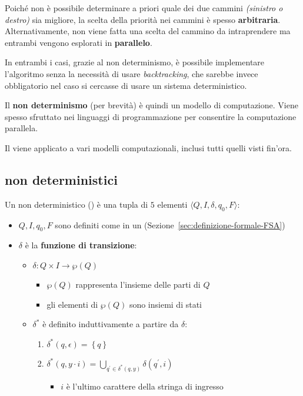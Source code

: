\documentclass[italian, 10pt]{article}
\begin{document}
Poiché non è possibile determinare a priori quale dei due cammini \textit{(sinistro o destro)} sia migliore, la scelta della priorità nei cammini è spesso \textbf{arbitraria}.
Alternativamente, non viene fatta una scelta del cammino da intraprendere ma entrambi vengono esplorati in \textbf{parallelo}.

In entrambi i casi, grazie al non determinismo, è possibile implementare l'algoritmo senza la necessità di usare \textit{backtracking}, che sarebbe invece obbligatorio nel caso si cercasse di usare un sistema deterministico.

\bigskip
Il \textbf{non determinismo} (\ND per brevità) è quindi un modello di computazione.
Viene spesso sfruttato nei linguaggi di programmazione per consentire la computazione parallela.

Il \ND viene applicato a vari modelli computazionali, inclusi tutti quelli visti fin'ora.

\subsection{\FSA non deterministici}
\label{sec:FSA-non-deterministici}

Un \FSA non deterministico (\NFA) è una tupla di \(5\) elementi \(\langle Q, I, \delta, q_0, F \rangle\):

\begin{itemize}
  \item \(Q, I, q_0, F\) sono definiti come in un \FSA (Sezione~\ref{sec:definizione-formale-FSA})
  \item \(\delta\) è la \textbf{funzione di transizione}:
        \begin{itemize}
          \item \(\delta: Q \times I \rightarrow \wp(Q)\)
                \begin{itemize}[label=\(\rightarrow\)]
                  \item \(\wp(Q)\) rappresenta l'insieme delle parti di \(Q\)
                  \item gli elementi di \(\wp(Q)\) sono insiemi di stati
                \end{itemize}
          \item \(\delta^\ast\) è definito induttivamente a partire da \(\delta\):
                \begin{enumerate}
                  \item \(\delta^\ast(q, \epsilon) = \left\{q\right\}\)
                  \item \(\displaystyle \delta^\ast(q, y \cdot i) = \bigcup_{q^\prime \in \delta^\ast (q, y)} \delta (q^\prime, i)\)
                        \begin{itemize}[label=\(\rightarrow\)]
                          \item \(i\) è l'ultimo carattere della stringa di ingresso
                        \end{itemize}
                \end{enumerate}
        \end{itemize}
\end{itemize}
\end{document}
